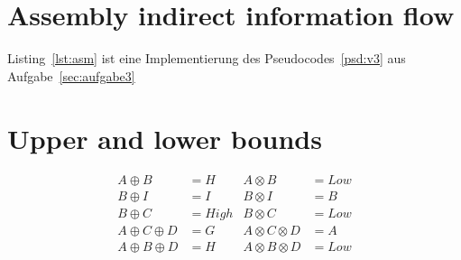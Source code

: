\section{Assembly indirect information flow}
Listing~\ref{lst:asm} ist eine Implementierung des Pseudocodes~\ref{psd:v3} aus
Aufgabe~\ref{sec:aufgabe3}


\section{Upper and lower bounds}

\begin{equation}
\begin{aligned}
A \oplus B &= H          & A \otimes B &= Low \\
B \oplus I &= I          & B \otimes I &= B \\
B \oplus C &= High       & B \otimes C &= Low \\
A \oplus C \oplus D &= G & A \otimes C \otimes D &= A \\
A \oplus B \oplus D &= H & A \otimes B \otimes D &= Low
\end{aligned}
\end{equation}


